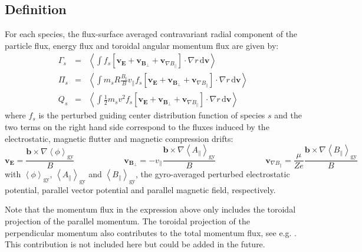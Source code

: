 \documentclass[fleqn]{report}
\begin{document}
\subsection{Definition}
For each species, the flux-surface averaged contravariant radial component of the particle flux, energy flux and toroidal angular momentum flux are given by:
\begin{eqnarray}
 \Gamma_s &=& \left<\int f_s \left[\mathbf{v}_\mathbf{E} + \mathbf{v}_{\mathbf{B}_\perp} + \mathbf{v}_{\nabla B_\parallel}  \right]\cdot \nabla r\,\textrm{d}\mathbf{v}\right> \\
  \Pi_s   &=& \left<\int m_s R \frac{B_t}{B}v_\parallel f_s  \left[\mathbf{v}_\mathbf{E} + \mathbf{v}_{\mathbf{B}_\perp} + \mathbf{v}_{\nabla B_\parallel}  \right] \cdot \nabla r\,\textrm{d}\mathbf{v}\right> \\
      Q_s &=& \left<\int \frac{1}{2}m_sv^2 f_s \left[\mathbf{v}_\mathbf{E} + \mathbf{v}_{\mathbf{B}_\perp} + \mathbf{v}_{\nabla B_\parallel}  \right] \cdot \nabla r\,\textrm{d}\mathbf{v}\right> 
\end{eqnarray}
where $f_s$ is the perturbed guiding center distribution function of species $s$ and the two terms on the right hand side correspond to the fluxes induced by the electrostatic, magnetic flutter and magnetic compression drifts:
\begin{equation}
 \mathbf{v}_\mathbf{E} = \frac{\mathbf{b}\times \nabla \left<\phi\right>_\textrm{gy} }{B} \qquad \qquad \qquad
 \mathbf{v}_{\mathbf{B}_\perp} = -v_\parallel \frac{\mathbf{b}\times \nabla \left<A_{\parallel}\right>_\textrm{gy}}{B}  \qquad \qquad \qquad
 \mathbf{v}_{\nabla B_\parallel} = \frac{\mu}{Ze} \frac{\mathbf{b}\times \nabla \left<B_{\parallel}\right>_\textrm{gy}}{B}
\end{equation}
with $\left<\phi\right>_\textrm{gy}$, $\left<A_{\parallel}\right>_\textrm{gy}$ and $\left<B_{\parallel}\right>_\textrm{gy}$, the gyro-averaged perturbed electrostatic potential, parallel vector potential and parallel magnetic field, respectively.

Note that the momentum flux in the expression above only includes the toroidal projection of the parallel momentum. The toroidal projection of the perpendicular momentum also contributes to the total momentum flux, see e.g. \cite{Scott:PoP2010}. This contribution is not included here but could be added in the future. 
\end{document}
